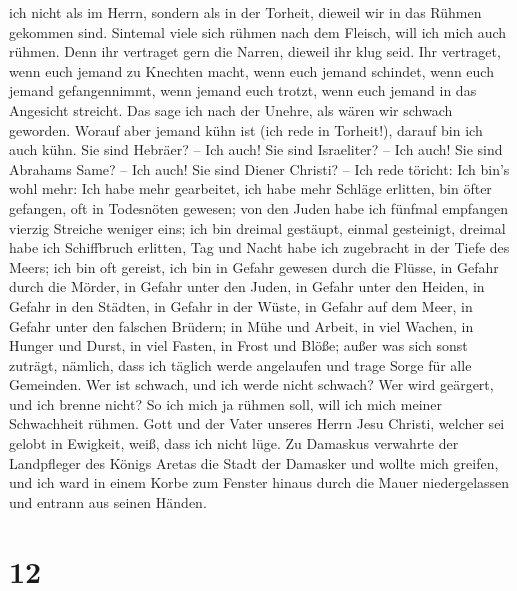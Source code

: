 ich nicht als im Herrn, sondern als in der Torheit, dieweil wir in das
Rühmen gekommen sind.  Sintemal viele sich rühmen nach
dem Fleisch, will ich mich auch rühmen.  Denn ihr
vertraget gern die Narren, dieweil ihr klug seid.  Ihr
vertraget, wenn euch jemand zu Knechten macht, wenn euch jemand
schindet, wenn euch jemand gefangennimmt, wenn jemand euch trotzt, wenn
euch jemand in das Angesicht streicht.  Das sage ich nach
der Unehre, als wären wir schwach geworden. Worauf aber jemand kühn ist
(ich rede in Torheit!), darauf bin ich auch kühn.  Sie
sind Hebräer? -- Ich auch! Sie sind Israeliter? -- Ich auch! Sie sind
Abrahams Same? -- Ich auch!  Sie sind Diener Christi? --
Ich rede töricht: Ich bin's wohl mehr: Ich habe mehr gearbeitet, ich
habe mehr Schläge erlitten, bin öfter gefangen, oft in Todesnöten
gewesen;  von den Juden habe ich fünfmal empfangen
vierzig Streiche weniger eins;  ich bin dreimal gestäupt,
einmal gesteinigt, dreimal habe ich Schiffbruch erlitten, Tag und Nacht
habe ich zugebracht in der Tiefe des Meers;  ich bin oft
gereist, ich bin in Gefahr gewesen durch die Flüsse, in Gefahr durch die
Mörder, in Gefahr unter den Juden, in Gefahr unter den Heiden, in Gefahr
in den Städten, in Gefahr in der Wüste, in Gefahr auf dem Meer, in
Gefahr unter den falschen Brüdern;  in Mühe und Arbeit,
in viel Wachen, in Hunger und Durst, in viel Fasten, in Frost und Blöße;
 außer was sich sonst zuträgt, nämlich, dass ich täglich
werde angelaufen und trage Sorge für alle Gemeinden.  Wer
ist schwach, und ich werde nicht schwach? Wer wird geärgert, und ich
brenne nicht?  So ich mich ja rühmen soll, will ich mich
meiner Schwachheit rühmen.  Gott und der Vater unseres
Herrn Jesu Christi, welcher sei gelobt in Ewigkeit, weiß, dass ich nicht
lüge.  Zu Damaskus verwahrte der Landpfleger des Königs
Aretas die Stadt der Damasker und wollte mich greifen, 
und ich ward in einem Korbe zum Fenster hinaus durch die Mauer
niedergelassen und entrann aus seinen Händen.

\hypertarget{section-11}{%
\section{12}\label{section-11}}

